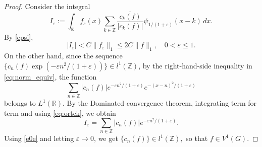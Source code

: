 \documentclass[10pt,a4paper]{amsart}
\newcommand{\R}{{\mathbb R}} \newcommand{\Q}{{\mathbb Q}} \newcommand{\Z}{{\mathbb Z}} \newcommand{\N}{{\mathbb N}}
\begin{document}
\begin{proof}
Consider the integral $$I_{\varepsilon}:=\int_\R f_\varepsilon(x)\sum_{k\in\Z}\frac{\overline{c_k(f)}}{|c_k(f)|}\psi_{1/(1+\varepsilon)}(x-k)\,dx.$$By \eqref{epsi}, 
\begin{equation}\label{e0e}|I_\varepsilon|<C\|f_\varepsilon\|_1\leq 2C\|f\|_1,\quad 0<\varepsilon\leq 1.\end{equation} On the other hand, since  the sequence $\{c_n(f)\exp(-\varepsilon n^2/(1+\varepsilon))\}\in l^1(\Z)$, by the right-hand-side inequality in \eqref{eq:norm_equiv}, the function  $$\sum_{n\in\Z}|c_n(f)|e^{-\varepsilon n^2/(1+\varepsilon)}e^{-(x-n)^2/(1+\varepsilon)}$$belongs to $L^1(\R).$ By the Dominated convergence theorem, integrating term for term  and using \eqref{eq:ortck}, we obtain $$I_\varepsilon =\sum_{n\in\Z}|c_n(f)|e^{-\varepsilon n^2/(1+\varepsilon)}.$$ Using \eqref{e0e} and  letting $\varepsilon \to 0$, we get $\{c_n(f)\}\in l^1(\Z),$ so that $f\in V^1(G).$
\end{proof}
\end{document}
